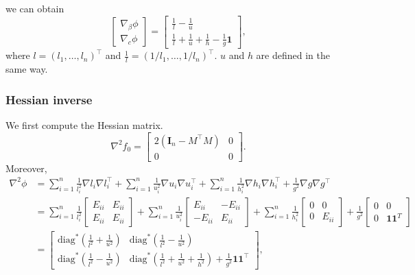 \documentclass[final,onefignum,onetabnum]{siamart190516}
\begin{document}
we can obtain
\begin{equation}
    \begin{bmatrix}
    \nabla_{\beta}\phi\\
    \nabla_{c}\phi
    \end{bmatrix} = \begin{bmatrix} \frac{1}{l} - \frac{1}{u} \\ \frac{1}{l} + \frac{1}{u} + \frac{1}{h} - \frac{1}{g}\mathbf{1}\end{bmatrix},
\end{equation}
where $l = (l_1,\dots,l_n)^\top$ and $\frac{1}{l} = (1/l_1,\dots,1/l_n)^\top$. $u$ and $h$ are defined in the same way.

\subsubsection{Hessian inverse}\label{sechessianinverse}
We first compute the Hessian matrix.
\begin{equation}
    \nabla^2 f_0 = \begin{bmatrix} 2(\mathbf{I}_n-M^\top M) &0\\0 &0\end{bmatrix}.
\end{equation}
Moreover,
\begin{equation}
\begin{aligned}
    \nabla^2 \phi &= \sum_{i=1}^n
\frac{1}{l_i^2}\nabla l_i\nabla l_i^\top + \sum_{i=1}^n
\frac{1}{u_i^2}\nabla u_i\nabla u_i^\top + \sum_{i=1}^n
\frac{1}{h_i^2}\nabla h_i\nabla h_i^\top + \frac{1}{g^2} \nabla g\nabla g^\top\\
&= \sum_{i=1}^n
\frac{1}{l_i^2}\begin{bmatrix} E_{ii} & E_{ii}\\ E_{ii} &E_{ii}\end{bmatrix} + \sum_{i=1}^n
\frac{1}{u_i^2}\begin{bmatrix} E_{ii} & -E_{ii}\\ -E_{ii} &E_{ii}\end{bmatrix} + \sum_{i=1}^n
\frac{1}{h_i^2}\begin{bmatrix} 0 & 0\\ 0 &E_{ii}\end{bmatrix} + \frac{1}{g^2} \begin{bmatrix} 0 & 0\\ 0 &\mathbf{1}\mathbf{1}^T\end{bmatrix}\\
&=\begin{bmatrix} \text{diag}^*(\frac{1}{l^2}+\frac{1}{u^2}) &  \text{diag}^*(\frac{1}{l^2}-\frac{1}{u^2})\\
\text{diag}^*(\frac{1}{l^2}-\frac{1}{u^2}) & \text{diag}^*(\frac{1}{l^2}+\frac{1}{u^2}+\frac{1}{h^2}) + \frac{1}{g^2}\mathbf{1}\mathbf{1}^\top\end{bmatrix},
\end{aligned}
\end{equation}
\end{document}
